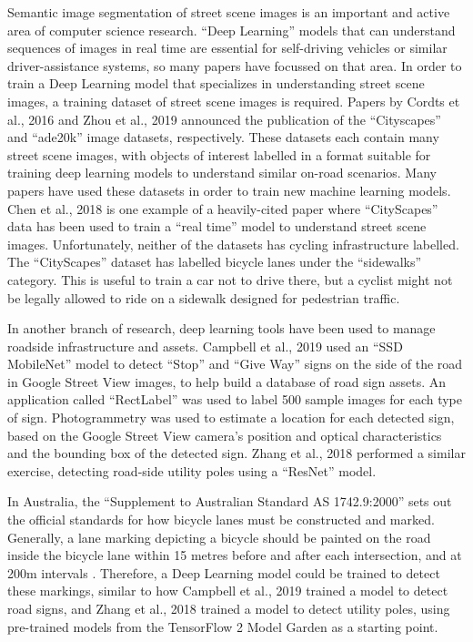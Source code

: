 \documentclass[11pt,twoside]{report}
\begin{document}
Semantic image segmentation of street scene images is an important and active area of computer science research.  ``Deep Learning'' models that can understand sequences of images in real time are essential for self-driving vehicles or similar driver-assistance systems, so many papers have focussed on that area.  In order to train a Deep Learning model that specializes in understanding street scene images, a training dataset of street scene images is required.  Papers by Cordts et al., 2016 \cite{Cordts_2016_CVPR} and Zhou et al., 2019 \cite{ade20k} announced the publication of the ``Cityscapes'' and ``ade20k'' image datasets, respectively.  These datasets each contain many street scene images, with objects of interest labelled in a format suitable for training deep learning models to understand similar on-road scenarios.  Many papers have used these datasets in order to train new machine learning models.  Chen et al., 2018 \cite{DEEPLAB} is one example of a heavily-cited paper where ``CityScapes'' data has been used to train a ``real time'' model to understand street scene images.  Unfortunately, neither of the datasets has cycling infrastructure labelled.  The ``CityScapes'' dataset has labelled bicycle lanes under the ``sidewalks'' category.  This is useful to train a car not to drive there, but a cyclist might not be legally allowed to ride on a sidewalk designed for pedestrian traffic.  

In another branch of research, deep learning tools have been used to manage roadside infrastructure and assets.  Campbell et al., 2019 \cite{CAMPBELL2019101350} used an ``SSD MobileNet'' model to detect ``Stop'' and ``Give Way'' signs on the side of the road in Google Street View images, to help build a database of road sign assets.  An application called ``RectLabel'' was used to label 500 sample images for each type of sign.  Photogrammetry was used to estimate a location for each detected sign, based on the Google Street View camera's position and optical characteristics and the bounding box of the detected sign.  Zhang et al., 2018 \cite{s18082484} performed a similar exercise, detecting road-side utility poles using a ``ResNet'' model.

In Australia, the ``Supplement to Australian Standard AS 1742.9:2000'' sets out the official standards for how bicycle lanes must be constructed and marked.  Generally, a lane marking depicting a bicycle should be painted on the road inside the bicycle lane within 15 metres before and after each intersection, and at 200m intervals \cite{standards}.  Therefore, a Deep Learning model could be trained to detect these markings, similar to how Campbell et al., 2019 \cite{CAMPBELL2019101350} trained a model to detect road signs, and Zhang et al., 2018 \cite{s18082484} trained a model to detect utility poles, using pre-trained models from the TensorFlow 2 Model Garden \cite{zoo} as a starting point.
\end{document}
